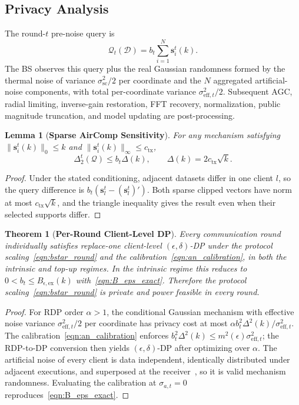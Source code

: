 \documentclass[journal]{IEEEtran}
\newtheorem{theorem}{Theorem}
\newtheorem{lemma}{Lemma}
\begin{document}
\subsection{Privacy Analysis}
The round-$t$ pre-noise query is
\begin{equation}
 \mathcal Q_t(\mathcal D)=b_t\sum_{i=1}^{N}\mathbf s_i^t(k).
 \label{eqn:privacy_query}
\end{equation}
The BS observes this query plus the real Gaussian randomness formed by the thermal noise of variance $\sigma_{\mathrm{sc}}^2/2$ per coordinate and the $N$ aggregated artificial-noise components, with total per-coordinate variance $\sigma_{\mathrm{eff},t}^2/2$. Subsequent AGC, radial limiting, inverse-gain restoration, FFT recovery, normalization, public magnitude truncation, and model updating are post-processing.

\begin{lemma}[\bf Sparse AirComp Sensitivity]\label{lemma:sen}
For any mechanism satisfying $\|\mathbf s_i^t(k)\|_0\le k$ and $\|\mathbf s_i^t(k)\|_\infty\le c_{\mathrm{tx}}$,
\begin{equation}
 \Delta_2^t(\mathcal Q)\le b_t\Delta(k),\qquad \Delta(k)=2c_{\mathrm{tx}}\sqrt{k}.
 \label{eqn:sensitivity_bound}
\end{equation}
\end{lemma}
\begin{proof}
Under the stated conditioning, adjacent datasets differ in one client $l$, so the query difference is $b_t(\mathbf s_l^t-(\mathbf s_l^t)')$. Both sparse clipped vectors have norm at most $c_{\mathrm{tx}}\sqrt{k}$, and the triangle inequality gives the result even when their selected supports differ.
\end{proof}

\begin{theorem}[\bf Per-Round Client-Level DP]\label{thm:dp}
Every communication round individually satisfies replace-one client-level $(\epsilon,\delta)$-DP under the protocol scaling~\eqref{eqn:bstar_round} and the calibration~\eqref{eqn:an_calibration}, in both the intrinsic and top-up regimes. In the intrinsic regime this reduces to $0<b_t\le B_{\epsilon,\mathrm{ex}}(k)$ with~\eqref{eqn:B_eps_exact}. Therefore the protocol scaling~\eqref{eqn:bstar_round} is private and power feasible in every round.
\end{theorem}
\begin{proof}
For RDP order $\alpha>1$, the conditional Gaussian mechanism with effective noise variance $\sigma_{\mathrm{eff},t}^2/2$ per coordinate has privacy cost at most $\alpha b_t^2\Delta^2(k)/\sigma_{\mathrm{eff},t}^2$. The calibration~\eqref{eqn:an_calibration} enforces $b_t^2\Delta^2(k)\le m^2(\epsilon)\sigma_{\mathrm{eff},t}^2$; the RDP-to-DP conversion then yields $(\epsilon,\delta)$-DP after optimizing over $\alpha$. The artificial noise of every client is data independent, identically distributed under adjacent executions, and superposed at the receiver~\cite{liu2024mimo}, so it is valid mechanism randomness. Evaluating the calibration at $\sigma_{a,t}=0$ reproduces~\eqref{eqn:B_eps_exact}.
\end{proof}
\end{document}
